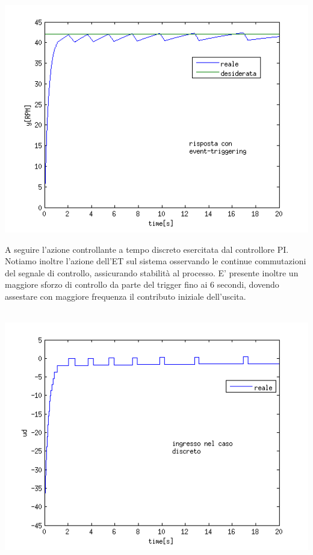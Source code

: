 \documentclass[a4paper,13pt]{article}
\begin{document}
\begin{center}
\includegraphics[scale=0.6]{graph/ydisc.png}
\end{center} 
	A seguire l'azione controllante a tempo discreto esercitata dal controllore PI. \\
	Notiamo inoltre l'azione dell'ET sul sistema osservando le continue commutazioni del segnale di controllo, assicurando 	stabilità al processo. E' presente inoltre un maggiore sforzo di controllo da parte del trigger fino ai 6 secondi, 			dovendo assestare con maggiore frequenza il contributo iniziale dell'uscita. \\ \\ 
\begin{center}
\includegraphics[scale=0.6]{graph/udisc.png} 
\end{center}
\end{document}
